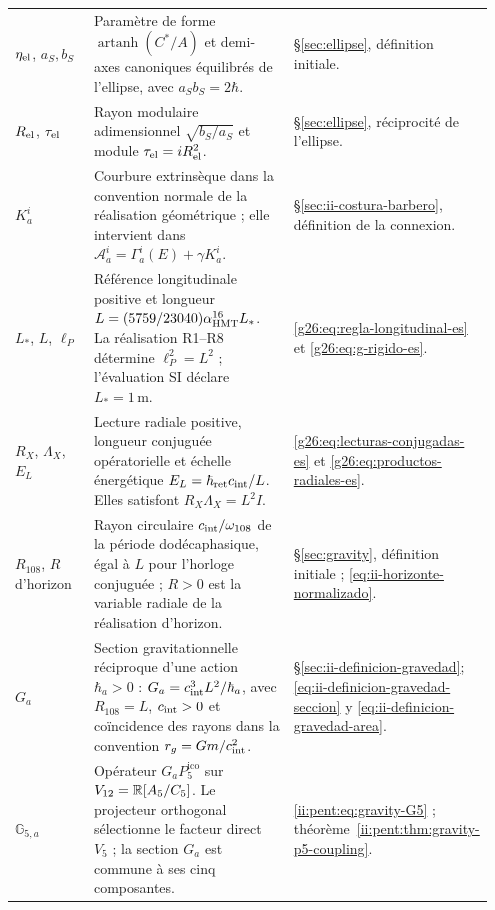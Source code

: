 \begin{longtable}{@{}>{\raggedright\arraybackslash}p{0.19\linewidth}
                    >{\raggedright\arraybackslash}p{0.49\linewidth}
                    >{\raggedright\arraybackslash}p{0.27\linewidth}@{}}
\(\eta_{\rm el}\), \(a_S,b_S\)
& Paramètre de forme \(\operatorname{artanh}(C^*/A)\) et
  demi-axes canoniques équilibrés de l'ellipse, avec
  \(a_Sb_S=2\hbar\).
& \S\ref{sec:ellipse}, définition initiale.\\[3pt]

\(R_{\rm el}\), \(\tau_{\rm el}\)
& Rayon modulaire adimensionnel \(\sqrt{b_S/a_S}\) et module
  \(\tau_{\rm el}=iR_{\rm el}^2\).
& \S\ref{sec:ellipse}, réciprocité de l'ellipse.\\[3pt]

\(K_a^i\)
& Courbure extrinsèque dans la convention normale de la réalisation
  géométrique ; elle intervient dans
  \(\mathcal A_a^i=\Gamma_a^i(E)+\gamma K_a^i\).
& \S\ref{sec:ii-costura-barbero}, définition de la connexion.\\[3pt]

\(L_*\), \(L\), \(\ell_P\)
& Référence longitudinale positive et longueur
  \(L=(5759/23040)\alpha_{\mathrm{HMT}}^{16}L_*\).
  La réalisation R1--R8 détermine \(\ell_P^2=L^2\) ;
  l’évaluation SI déclare \(L_*=1\,\mathrm m\).
& \eqref{g26:eq:regla-longitudinal-es} et
  \eqref{g26:eq:g-rigido-es}.\\[3pt]

\(R_X\), \(\Lambda_X\), \(E_L\)
& Lecture radiale positive, longueur conjuguée opératorielle et échelle
  énergétique \(E_L=\hbar_{\rm ret}c_{\rm int}/L\).
  Elles satisfont \(R_X\Lambda_X=L^2I\).
& \eqref{g26:eq:lecturas-conjugadas-es} et
  \eqref{g26:eq:productos-radiales-es}.\\[3pt]

\(R_{108}\), \(R\) d'horizon
& Rayon circulaire \(c_{\rm int}/\omega_{108}\) de la période
  dodécaphasique, égal à \(L\) pour l’horloge conjuguée ;
  \(R>0\) est la variable radiale de la réalisation
  d’horizon.
& \S\ref{sec:gravity}, définition initiale ;
  \eqref{eq:ii-horizonte-normalizado}.\\[3pt]

\(G_a\)
& Section gravitationnelle réciproque d’une action \(\hbar_a>0\) :
  \(G_a=c_{\rm int}^{3}L^{2}/\hbar_a\), avec \(R_{108}=L\),
  \(c_{\rm int}>0\) et coïncidence des rayons dans la convention
  \(r_g=Gm/c_{\rm int}^{2}\).
& \S\ref{sec:ii-definicion-gravedad};
  \eqref{eq:ii-definicion-gravedad-seccion} y
  \eqref{eq:ii-definicion-gravedad-area}.\\[3pt]

\(\mathbb G_{5,a}\)
& Opérateur \(G_aP^{\mathrm{ico}}_5\) sur
  \(V_{12}=\mathbb R[A_5/C_5]\). Le projecteur orthogonal sélectionne
  le facteur direct \(V_5\) ; la section \(G_a\) est commune à ses cinq
  composantes.
& \eqref{ii:pent:eq:gravity-G5} ;
  théorème~\ref{ii:pent:thm:gravity-p5-coupling}.\\[3pt]


\end{longtable}
